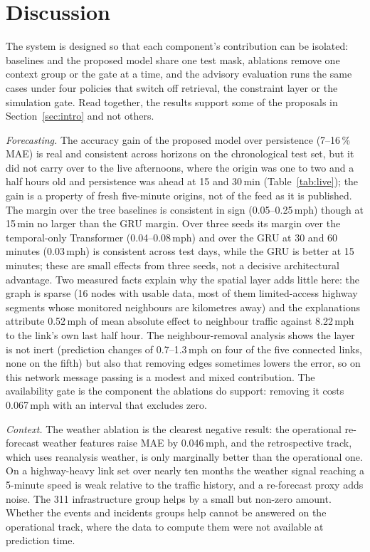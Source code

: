 \section{Discussion}
\label{sec:discussion}
The system is designed so that each component's contribution can be isolated: baselines and the proposed model share
one test mask, ablations remove one context group or the gate at a time, and the advisory evaluation runs the same
cases under four policies that switch off retrieval, the constraint layer or the simulation gate. Read together, the
results support some of the proposals in Section~\ref{sec:intro} and not others.

\textit{Forecasting.} The accuracy gain of the proposed model over persistence (7--16\,\% MAE) is real and consistent
across horizons on the chronological test set, but it did not carry over to the live afternoons, where the origin was
one to two and a half hours old and persistence was ahead at 15 and 30\,min (Table~\ref{tab:live}); the gain is a
property of fresh five-minute origins, not of the feed as it is published. The margin over the tree baselines is consistent in sign (0.05--0.25\,mph) though at 15\,min no
larger than the GRU margin. Over three seeds its margin over the temporal-only Transformer
(0.04--0.08\,mph) and over the GRU at 30 and 60 minutes (0.03\,mph) is consistent across test days, while the GRU is
better at 15 minutes; these are small effects from three seeds, not a decisive architectural advantage. Two measured facts explain why the spatial layer adds little here: the graph
is sparse (16 nodes with usable data, most of them limited-access highway segments whose monitored neighbours are
kilometres away) and the explanations attribute 0.52\,mph of mean absolute effect to neighbour traffic against
8.22\,mph to the link's own last half hour. The neighbour-removal analysis shows the layer is not inert (prediction
changes of 0.7--1.3\,mph on four of the five connected links, none on the fifth) but also that removing edges sometimes lowers the error, so on this
network message passing is a modest and mixed contribution. The availability gate is the component the ablations do
support: removing it costs 0.067\,mph with an interval that excludes zero.

\textit{Context.} The weather ablation is the clearest negative result: the operational re-forecast weather features
raise MAE by 0.046\,mph, and the retrospective track, which uses reanalysis weather, is only marginally better than
the operational one. On a highway-heavy link set over nearly ten months the weather signal reaching a 5-minute speed is
weak relative to the traffic history, and a re-forecast proxy adds noise. The 311 infrastructure group helps by a
small but non-zero amount. Whether the events and incidents groups help cannot be answered on the operational track,
where the data to compute them were not available at prediction time.

